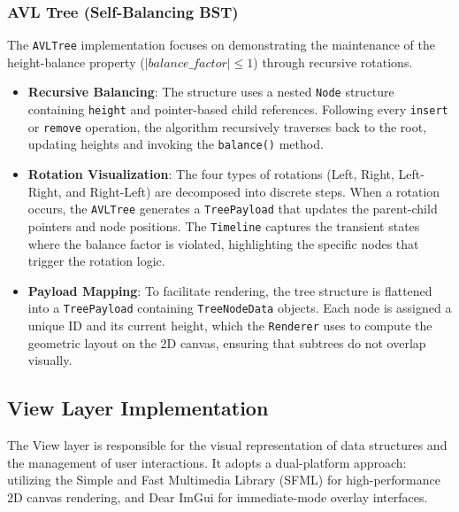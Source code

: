 \subsubsection{AVL Tree (Self-Balancing BST)}
The \texttt{AVLTree} implementation focuses on demonstrating the maintenance of the height-balance property ($|balance\_factor| \leq 1$) through recursive rotations.

\begin{itemize}
    \item \textbf{Recursive Balancing}: The structure uses a nested \texttt{Node} structure containing \texttt{height} and pointer-based child references. Following every \texttt{insert} or \texttt{remove} operation, the algorithm recursively traverses back to the root, updating heights and invoking the \texttt{balance()} method.
    \item \textbf{Rotation Visualization}: The four types of rotations (Left, Right, Left-Right, and Right-Left) are decomposed into discrete steps. When a rotation occurs, the \texttt{AVLTree} generates a \texttt{TreePayload} that updates the parent-child pointers and node positions. The \texttt{Timeline} captures the transient states where the balance factor is violated, highlighting the specific nodes that trigger the rotation logic.
    \item \textbf{Payload Mapping}: To facilitate rendering, the tree structure is flattened into a \texttt{TreePayload} containing \texttt{TreeNodeData} objects. Each node is assigned a unique ID and its current height, which the \texttt{Renderer} uses to compute the geometric layout on the 2D canvas, ensuring that subtrees do not overlap visually.
\end{itemize}

\subsection{View Layer Implementation}

The View layer is responsible for the visual representation of data structures and the management of user interactions. It adopts a dual-platform approach: utilizing the Simple and Fast Multimedia Library (SFML) for high-performance 2D canvas rendering, and Dear ImGui for immediate-mode overlay interfaces.

